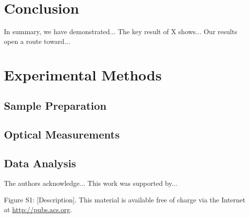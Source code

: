 \documentclass[journal=nalefd,manuscript=article]{achemso}
\begin{document}
\section{Conclusion}

In summary, we have demonstrated...
The key result of X shows...
Our results open a route toward...

\section{Experimental Methods}

\subsection{Sample Preparation}

\subsection{Optical Measurements}

\subsection{Data Analysis}

\begin{acknowledgement}
The authors acknowledge...
This work was supported by...
\end{acknowledgement}

\begin{suppinfo}
Figure S1: [Description].
This material is available free of charge via the Internet at \url{http://pubs.acs.org}.
\end{suppinfo}


\end{document}

